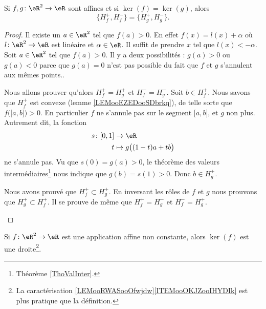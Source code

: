 \begin{lemma}        \label{LEMooXLNZooFyqPxG}
	Si \( f,g\colon \eR^2\to \eR\) sont affines et si \( \ker(f)=\ker(g)\), alors
	\begin{equation}
		\{H_f^+,H_f^-\}=\{ H_g^+,H_g^- \}.
	\end{equation}
\end{lemma}

\begin{proof}
	Il existe un \( a\in \eR^2\) tel que \( f(a)>0\). En effet \( f(x)=l(x)+\alpha\) où \( l\colon \eR^2\to \eR\) est linéaire et \( \alpha\in \eR\). Il suffit de prendre \( x\) tel que \( l(x)<-\alpha\).
	Soit \( a\in \eR^2\) tel que \( f(a)>0\). Il y a deux possibilités : \( g(a)>0\) ou \( g(a)<0\) parce que \( g(a)=0\) n'est pas possible du fait que \( f\) et \( g\) s'annulent aux mêmes points..

	\begin{subproof}
		\spitem[Si \( g(a)>0\)]
		Nous allons prouver qu'alors \( H^+_f=H^+_g\) et \( H^-_f=H^-_g\). Soit \( b\in H_f^+\). Nous savons que \( H_f^+\) est convexe (lemme \ref{LEMooEZEDooSDbrkq}), de telle sorte que \( f\big( \mathopen[ a , b \mathclose] \big)>0\). En particulier \( f\) ne s'annule pas sur le segment \( \mathopen[ a , b \mathclose]\), et \( g\) non plus. Autrement dit, la fonction
		\begin{equation}
			\begin{aligned}
				s\colon \mathopen[ 0 , 1 \mathclose] & \to \eR                        \\
				t                                    & \mapsto g\big( (1-t)a+tb \big)
			\end{aligned}
		\end{equation}
		ne s'annule pas. Vu que \( s(0)=g(a)>0\), le théorème des valeurs intermédiaires\footnote{Théorème \ref{ThoValInter}.} nous indique que \( g(b)= s(1)>0\). Donc \( b\in H_g^+\).

		Nous avons prouvé que \( H_f^+\subset H_g^+\). En inversant les rôles de \( f\) et \( g\) nous prouvons que \( H_g^+\subset H_f^+\).
		\spitem[Si \( g(a)<0\)]
		Il se prouve de même que \( H^+_f=H^-_g\) et \( H^-_f=H^+_g\).
	\end{subproof}
\end{proof}

\begin{proposition}     \label{PROPooSIANooTOKlBI}
	Si \( f\colon \eR^2\to \eR\) est une application affine non constante, alors \( \ker(f)\) est une droite\footnote{La caractérisation \ref{LEMooRWASooOfwjdw}\ref{ITEMooOKJZooIHYDIk} est plus pratique que la définition.}.
\end{proposition}

